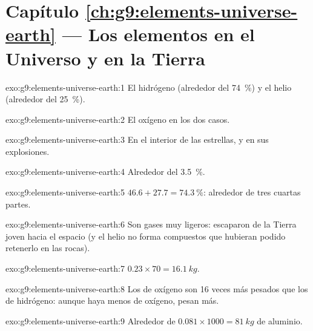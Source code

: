 \section*{Capítulo \ref{ch:g9:elements-universe-earth} --- Los elementos en el Universo y en la Tierra}

\begin{solution}{exo:g9:elements-universe-earth:1}
El hidrógeno (alrededor del \qty{74}{\percent}) y el helio (alrededor
del \qty{25}{\percent}).
\end{solution}

\begin{solution}{exo:g9:elements-universe-earth:2}
El oxígeno en los dos casos.
\end{solution}

\begin{solution}{exo:g9:elements-universe-earth:3}
En el interior de las estrellas, y en sus explosiones.
\end{solution}

\begin{solution}{exo:g9:elements-universe-earth:4}
Alrededor del \qty{3.5}{\percent}.
\end{solution}

\begin{solution}{exo:g9:elements-universe-earth:5}
$46.6 + 27.7 = \qty{74.3}{\percent}$: alrededor de tres cuartas partes.
\end{solution}

\begin{solution}{exo:g9:elements-universe-earth:6}
Son gases muy ligeros: escaparon de la Tierra joven hacia el espacio (y
el helio no forma compuestos que hubieran podido retenerlo en las
rocas).
\end{solution}

\begin{solution}{exo:g9:elements-universe-earth:7}
$0.23 \times 70 = \qty{16.1}{kg}$.
\end{solution}

\begin{solution}{exo:g9:elements-universe-earth:8}
Los  de oxígeno son 16 veces más pesados que los de hidrógeno:
aunque haya menos  de oxígeno, pesan más.
\end{solution}

\begin{solution}{exo:g9:elements-universe-earth:9}
Alrededor de $0.081 \times 1000 = \qty{81}{kg}$ de aluminio.
\end{solution}

